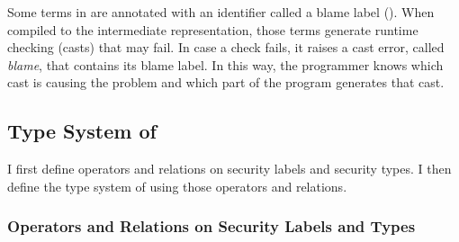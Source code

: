 Some terms in \Surface are annotated with an identifier called a blame label
(). When compiled to the intermediate representation, those terms generate
runtime checking (casts) that may fail. In case a check fails, it raises a cast
error, called \textit{blame}, that contains its blame label. In this way, the
programmer knows which cast is causing the problem and which part of the program
generates that cast.

\subsection{Type System of \Surface}
\label{sec:surface-typing}

I first define operators and relations on security labels and security types. I
then define the type system of \Surface using those operators and relations.

\subsubsection{Operators and Relations on Security Labels and Types}

